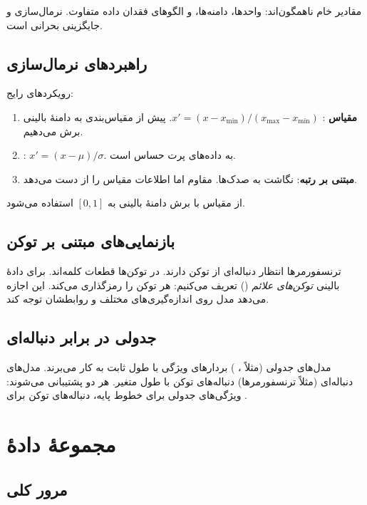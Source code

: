 مقادیر خام ناهمگون‌اند: واحدها، دامنه‌ها، و الگوهای فقدان داده متفاوت. نرمال‌سازی و جایگزینی بحرانی است.

\subsection{راهبردهای نرمال‌سازی}

رویکردهای رایج:
\begin{enumerate}
\item \textbf{مقیاس }: $x' = (x - x_{\min}) / (x_{\max} - x_{\min})$. پیش از مقیاس‌بندی به دامنۀ بالینی برش می‌دهیم.
\item \textbf{}: $x' = (x - \mu) / \sigma$. به داده‌های پرت حساس است.
\item \textbf{مبتنی بر رتبه}: نگاشت به صدک‌ها. مقاوم اما اطلاعات مقیاس را از دست می‌دهد.
\end{enumerate}
از مقیاس  با برش دامنۀ بالینی به $[0,1]$ استفاده می‌شود.

\subsection{بازنمایی‌های مبتنی بر توکن}

ترنسفورمرها انتظار دنباله‌ای از توکن دارند. در  توکن‌ها قطعات کلمه‌اند. برای دادۀ بالینی \emph{توکن‌های علائم} () تعریف می‌کنیم: هر توکن  را رمزگذاری می‌کند. این اجازه می‌دهد مدل روی اندازه‌گیری‌های مختلف و روابطشان توجه کند.

\subsection{جدولی در برابر دنباله‌ای}

مدل‌های جدولی (مثلاً ، ) بردارهای ویژگی با طول ثابت به کار می‌برند. مدل‌های دنباله‌ای (مثلاً ترنسفورمرها) دنباله‌های توکن با طول متغیر. هر دو پشتیبانی می‌شوند: ویژگی‌های جدولی برای خطوط پایه، دنباله‌های توکن برای .

\section{مجموعۀ دادۀ }

\subsection{مرور کلی}

